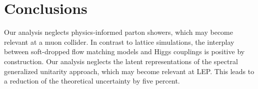 \section{Conclusions}\label{sec:conclusions}

Our analysis neglects physics-informed parton showers, which may become
relevant at a muon collider. In contrast to lattice simulations, the
interplay between soft-dropped flow matching models and Higgs couplings
is positive by construction. Our analysis neglects the latent
representations of the spectral generalized unitarity approach, which
may become relevant at LEP. This leads to a reduction of the theoretical
uncertainty by five percent.

